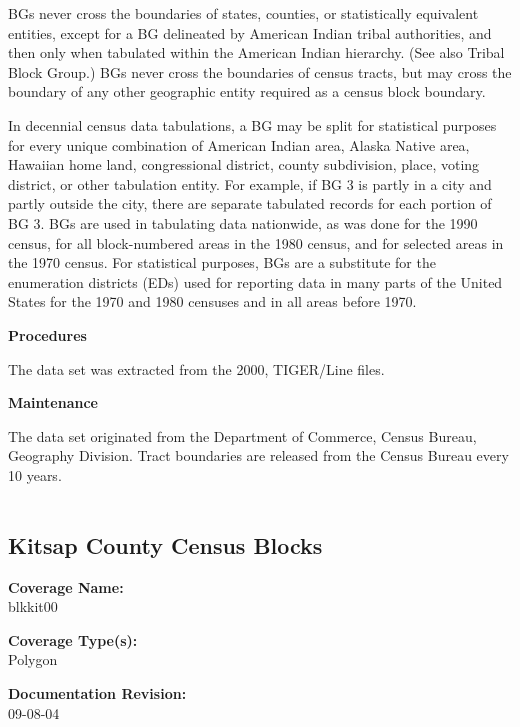 BGs never cross the boundaries of states, counties, or
statistically equivalent entities, except for a BG delineated by
American Indian tribal authorities, and then only when tabulated
within the American Indian hierarchy. (See also Tribal Block
Group.) BGs never cross the boundaries of census tracts, but may
cross the boundary of any other geographic entity required as a
census block boundary.

In decennial census data tabulations, a BG may be split for
statistical purposes for every unique combination of American
Indian area, Alaska Native area, Hawaiian home land, congressional
district, county subdivision, place, voting district, or other
tabulation entity. For example, if BG 3 is partly in a city and
partly outside the city, there are separate tabulated records for
each portion of BG 3. BGs are used in tabulating data nationwide,
as was done for the 1990 census, for all block-numbered areas in
the 1980 census, and for selected areas in the 1970 census. For
statistical purposes, BGs are a substitute for the enumeration
districts (EDs) used for reporting data in many parts of the
United States for the 1970 and 1980 censuses and in all areas
before 1970.

{\bf \large Procedures}

The data set was extracted from the 2000, TIGER/Line files.

{\bf \large Maintenance}

The data set originated from the Department of Commerce, Census
Bureau, Geography Division. Tract boundaries are released from the
Census Bureau every 10 years.

\begin{landscape}
\begin{longtable}{llrrrrrc}

\end{longtable}
\end{landscape}
\newpage

\subsection{Kitsap County Census Blocks}

{\bf \large Coverage Name:}\\
blkkit00

{\bf \large Coverage Type(s):}\\
Polygon

{\bf \large Documentation Revision:}\\
09-08-04

